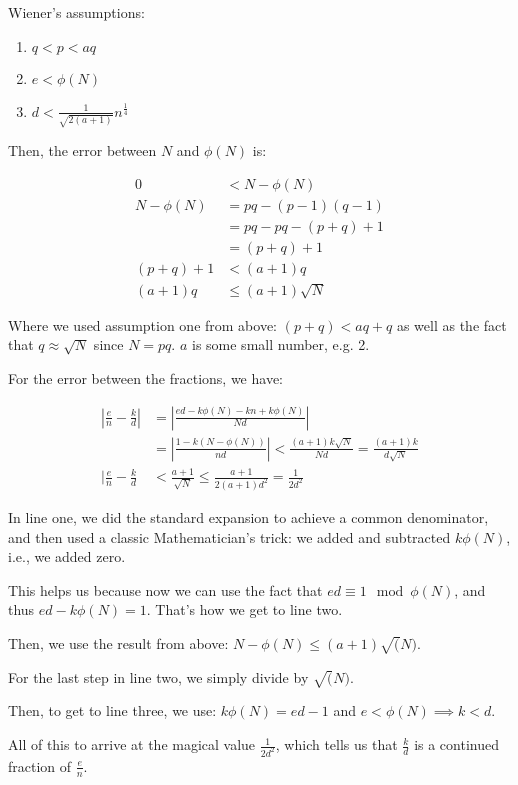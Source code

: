 \documentclass{article}
\begin{document}
Wiener's assumptions:

\begin{enumerate}
    \item $q<p<aq$
    \item $e<\phi(N)$
    \item $d<\frac{1}{\sqrt{2(a+1)}}n^\frac{1}{4}$
\end{enumerate}

Then, the error between $N$ and $\phi(N)$ is:

\begin{align*}
    0           &< N - \phi(N) \\
    N - \phi(N) &= pq - (p-1)(q-1) \\
                &= pq - pq - (p+q) + 1 \\
                &= (p+q) + 1 \\
    (p+q) + 1   &< (a+1)q \\
    (a+1)q      &\leq (a+1)\sqrt{N}
\end{align*}

Where we used assumption one from above: $(p+q)<aq+q$ as well as the fact that $q\approx\sqrt{N}$ since $N=pq$. $a$ is some small number, e.g. 2.\medskip

For the error between the fractions, we have:

\begin{align*}
    |\frac{e}{n}-\frac{k}{d}| &= |\frac{ed-k\phi(N)-kn+k\phi(N)}{Nd}| \\
                              &= |\frac{1-k(N-\phi(N))}{nd}| < \frac{(a+1)k\sqrt{N}}{Nd} = \frac{(a+1)k}{d\sqrt{N}}  \\
    |\frac{e}{n}-\frac{k}{d} &< \frac{a+1}{\sqrt{N}}\leq \frac{a+1}{2(a+1)d^2}=\frac{1}{2d^2}
\end{align*}

In line one, we did the standard expansion to achieve a common denominator, and then used a classic Mathematician's trick: we added and subtracted $k\phi(N)$, i.e., we added zero. \smallskip

This helps us because now we can use the fact that $ed \equiv 1 \mod \phi(N)$, and thus $ed-k\phi(N)=1$. That's how we get to line two. \smallskip

Then, we use the result from above: $N-\phi(N)\leq (a+1)\sqrt(N)$. \smallskip

For the last step in line two, we simply divide by $\sqrt(N)$. \smallskip

Then, to get to line three, we use: $k\phi(N)=ed-1$ and $e < \phi(N) \implies k < d$.\smallskip

All of this to arrive at the magical value $\frac{1}{2d^2}$, which tells us that $\frac{k}{d}$ is a continued fraction of $\frac{e}{n}$.
\end{document}
